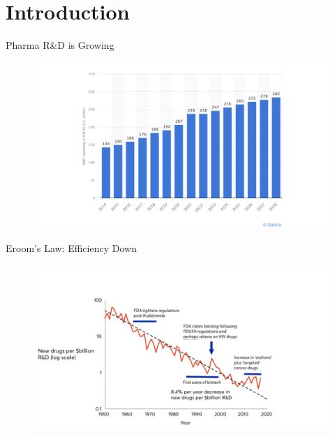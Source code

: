 \section{Introduction}%
\frame{\tableofcontents[currentsection]}

\begin{frame}{Pharma R\&D is Growing}
\begin{figure}
    \centering
    \includegraphics[width=\linewidth]{figs/pharma_growing.png}
\end{figure}
\end{frame}

\begin{frame}{Eroom's Law: Efficiency Down}
\begin{figure}
    \centering
    \includegraphics[width=\linewidth]{figs/efficiency_down.png}
\end{figure}    
\end{frame}

